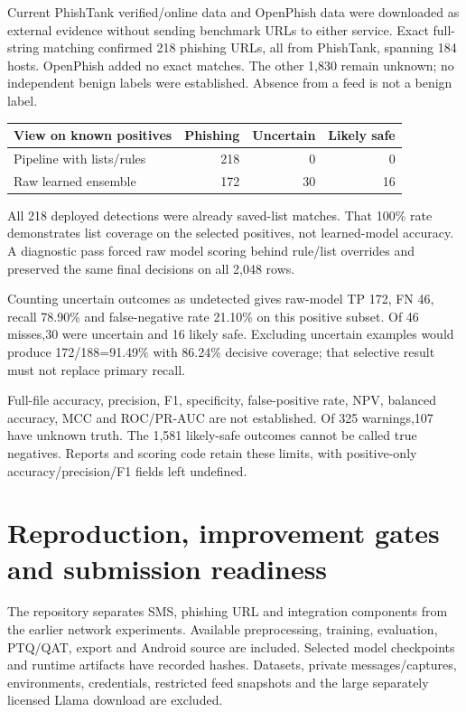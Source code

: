 \documentclass[11pt,a4paper,oneside]{report}
\begin{document}
Current PhishTank verified/online data and OpenPhish data were downloaded as external evidence without sending benchmark URLs to either service. Exact full-string matching confirmed 218 phishing URLs, all from PhishTank, spanning 184 hosts. OpenPhish added no exact matches. The other 1,830 remain unknown; no independent benign labels were established. Absence from a feed is not a benign label.


{\small
\begin{longtable}{@{}lrrr@{}}
\toprule
View on known positives & Phishing & Uncertain & Likely safe\\\midrule\endhead
Pipeline with lists/rules & 218 & 0 & 0\\
Raw learned ensemble & 172 & 30 & 16\\
\bottomrule\end{longtable}
}


All 218 deployed detections were already saved-list matches. That 100\% rate demonstrates list coverage on the selected positives, not learned-model accuracy. A diagnostic pass forced raw model scoring behind rule/list overrides and preserved the same final decisions on all 2,048 rows.

Counting uncertain outcomes as undetected gives raw-model TP 172, FN 46, recall 78.90\% and false-negative rate 21.10\% on this positive subset. Of 46 misses,30 were uncertain and 16 likely safe. Excluding uncertain examples would produce 172/188=91.49\% with 86.24\% decisive coverage; that selective result must not replace primary recall.

Full-file accuracy, precision, F1, specificity, false-positive rate, NPV, balanced accuracy, MCC and ROC/PR-AUC are not established. Of 325 warnings,107 have unknown truth. The 1,581 likely-safe outcomes cannot be called true negatives. Reports and scoring code retain these limits, with positive-only accuracy/precision/F1 fields left undefined.

\chapter{Reproduction, improvement gates and submission readiness}
The repository separates SMS, phishing URL and integration components from the earlier network experiments. Available preprocessing, training, evaluation, PTQ/QAT, export and Android source are included. Selected model checkpoints and runtime artifacts have recorded hashes. Datasets, private messages/captures, environments, credentials, restricted feed snapshots and the large separately licensed Llama download are excluded.
\end{document}
